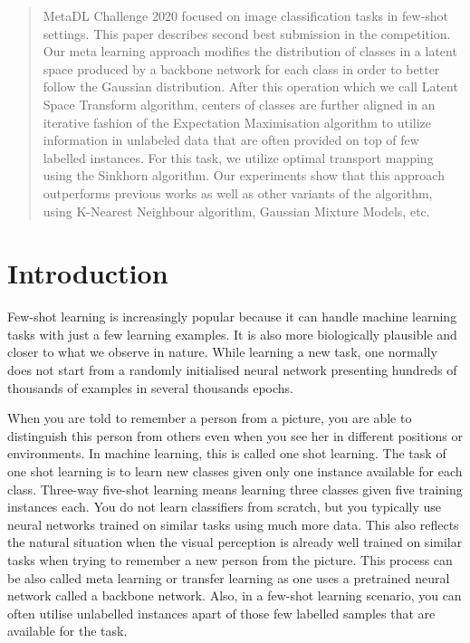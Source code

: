 \documentclass[letterpaper]{article} \usepackage{aaai20}  \usepackage{times}  \usepackage{helvet} \usepackage{courier}  \usepackage[hyphens]{url}  \usepackage{graphicx} \urlstyle{rm} \def\UrlFont{\rm}  \usepackage{graphicx}  \frenchspacing  \setlength{\pdfpagewidth}{8.5in}  \setlength{\pdfpageheight}{11in}  \usepackage[ruled,vlined]{algorithm2e}
\author{Tom\'{a}\v{s} Chobola, Daniel Va\v{s}ata and Pavel Kord\'{i}k\\ Faculty of Information Technology, Czech Technical University in Prague\\ Thakurova 9\\
Prague, Czech Republic\\
choboto1@fit.cvut.cz }
\begin{document}
\maketitle
\begin{abstract}
MetaDL Challenge 2020 focused on image classification tasks in few-shot settings. This paper describes second best submission in the competition. Our meta learning approach modifies the distribution of classes in a latent space produced by a backbone network for each class in order to better follow the Gaussian distribution. After this operation which we call Latent Space Transform algorithm, centers of classes are further aligned in an iterative fashion of the Expectation Maximisation algorithm to utilize information in unlabeled data that are often provided on top of few labelled instances. For this task, we utilize optimal transport mapping using the Sinkhorn algorithm. Our experiments show that this approach outperforms previous works as well as other variants of the algorithm, using K-Nearest Neighbour algorithm, Gaussian Mixture Models, etc.
\end{abstract}

\section{Introduction}
Few-shot learning is increasingly popular because it can handle machine learning tasks with just a few learning examples. It is also more biologically plausible and closer to what we observe in nature. While learning a new task, one normally does not start from a randomly initialised neural network presenting hundreds of thousands of examples in several thousands epochs. 

When you are told to remember a person from a picture, you are able to distinguish this person from others even when you see her in different positions or environments. In machine learning, this is called one shot learning. The task of one shot learning is to learn new classes given only one instance available for each class. Three-way five-shot learning means learning three classes given five training instances each. You do not learn classifiers from scratch, but you typically use neural networks trained on similar tasks using much more data. This also reflects the natural situation when the visual perception is already well trained on similar tasks when trying to remember a new person from the picture. 
This process can be also called meta learning or transfer learning as one uses a pretrained neural network called a backbone network. 
Also, in a few-shot learning scenario, you can often utilise unlabelled instances apart of those few labelled samples that are available for the task.
\end{document}
